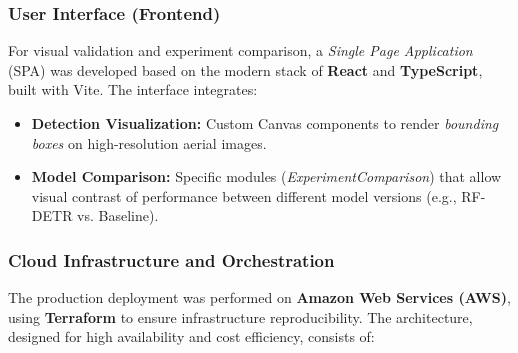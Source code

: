 \subsubsection{User Interface (Frontend)}

For visual validation and experiment comparison, a \textit{Single Page Application} (SPA) was developed based on the modern stack of \textbf{React} and \textbf{TypeScript}, built with Vite. The interface integrates:
\begin{itemize}
    \item \textbf{Detection Visualization:} Custom Canvas components to render \textit{bounding boxes} on high-resolution aerial images.
    \item \textbf{Model Comparison:} Specific modules (\textit{ExperimentComparison}) that allow visual contrast of performance between different model versions (e.g., RF-DETR vs. Baseline).
\end{itemize}

\subsubsection{Cloud Infrastructure and Orchestration}

The production deployment was performed on \textbf{Amazon Web Services (AWS)}, using \textbf{Terraform} to ensure infrastructure reproducibility. The architecture, designed for high availability and cost efficiency, consists of:

